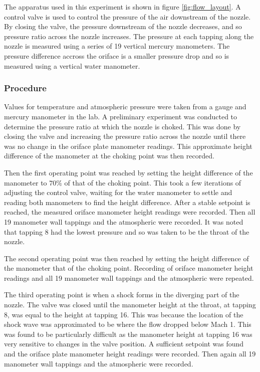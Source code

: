 \documentclass{article}
\begin{document}
The apparatus used in this experiment is shown in figure \ref{fig:flow_layout}.
A control valve is used to control the pressure of the air downstream of the nozzle. By closing the valve, the pressure downstream of the nozzle decreases, and so pressure ratio across the nozzle increases.
The pressure at each tapping along the nozzle is measured using a series of 19 vertical mercury manometers.
The pressure difference accross the oriface is a smaller pressure drop and so is measured using a vertical water manometer.

\subsubsection{Procedure}

Values for temperature and atmospheric pressure were taken from a gauge and mercury manometer in the lab.
A preliminary experiment was conducted to determine the pressure ratio at which the nozzle is choked.
This was done by closing the valve and increasing the pressure ratio across the nozzle until there was no change in the oriface plate manometer readings.
This approximate height difference of the manometer at the choking point was then recorded.

Then the first operating point was reached by setting the height difference of the manometer to $70\%$ of that of the choking point.
This took a few iterations of adjusting the control valve, waiting for the water manometer to settle and reading both manometers to find the height difference.
After a stable setpoint is reached, the measured oriface manometer height readings were recorded. 
Then all 19 manometer wall tappings and the atmospheric were recorded.
It was noted that tapping 8 had the lowest pressure and so was taken to be the throat of the nozzle.

The second operating point was then reached by setting the height difference of the manometer that of the choking point.
Recording of oriface manometer height readings and all 19 manometer wall tappings and the atmospheric were repeated.

The third operating point is when a shock forms in the diverging part of the nozzle. The valve was closed until the manometer height at the throat, at tapping 8, was equal to the height at tapping 16.
This was because the location of the shock wave was approximated to be where the flow dropped below Mach 1.
This was found to be particularly difficult as the manometer height at tapping 16 was very sensitive to changes in the valve position.
A sufficient setpoint was found and the oriface plate manometer height readings were recorded.
Then again all 19 manometer wall tappings and the atmospheric were recorded.
\end{document}

